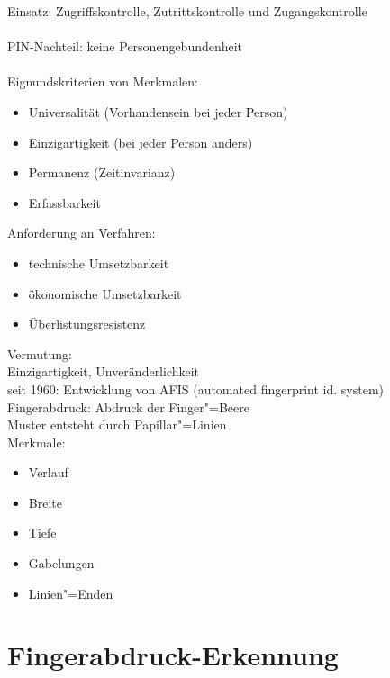 \documentclass[a4paper,12pt]{scrreprt}
\begin{document}
Einsatz: Zugriffskontrolle, Zutrittskontrolle und Zugangskontrolle \\
\\
PIN-Nachteil: keine Personengebundenheit\\
\\
Eignundskriterien von Merkmalen:
\begin{itemize}
	\item Universalität (Vorhandensein bei jeder Person)
	\item Einzigartigkeit (bei jeder Person anders)
	\item Permanenz (Zeitinvarianz)
	\item Erfassbarkeit
\end{itemize}
Anforderung an Verfahren:\\
\begin{itemize}
 \item technische Umsetzbarkeit
 \item ökonomische Umsetzbarkeit
 \item Überlistungsresistenz
\end{itemize}
Vermutung:\\
Einzigartigkeit, Unveränderlichkeit\\
seit 1960: Entwicklung von AFIS (automated fingerprint id. system)\\
Fingerabdruck: Abdruck der Finger"=Beere
\\
Muster entsteht durch Papillar"=Linien\\
Merkmale:
\begin{itemize}
	\item Verlauf
	\item Breite
	\item Tiefe
	\item Gabelungen
	\item Linien"=Enden
\end{itemize}

\section{Fingerabdruck-Erkennung}
\end{document}

